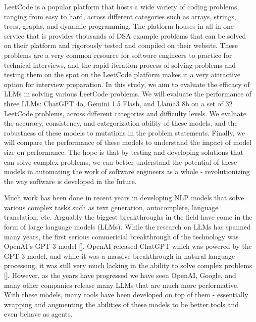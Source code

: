 \documentclass[times, 10pt,twocolumn]{article}
\begin{document}
LeetCode is a popular platform that hosts a wide variety of coding problems, ranging from easy to hard, across different categories such as arrays, strings, trees, graphs, and dynamic programming. The platform houses in all in one service that is provides thousands of DSA example problems that can be solved on their platform and rigorously tested and compiled on their website. These problems are a very common resource for software engineers to practice for technical interviews, and the rapid iteration process of solving problems and testing them on the spot on the LeetCode platform makes it a very attractive option for interview preparation. In this study, we aim to evaluate the efficacy of LLMs in solving various LeetCode problems. We will evaluate the performance of three LLMs: ChatGPT 4o, Gemini 1.5 Flash, and Llama3 8b on a set of 32 LeetCode problems, across different categories and difficulty levels. We evaluate the accuracy, consistency, and categorization ability of these models, and the robustness of these models to mutations in the problem statements. Finally, we will compare the performance of these models to understand the impact of model size on performance. The hope is that by testing and developing solutions that can solve complex problems, we can better understand the potential of these models in automating the work of software engineers as a whole - revolutionizing the way software is developed in the future.



Much work has been done in recent years in developing NLP models that solve various complex tasks such as text generation, autocomplete, language translation, etc. Arguably the biggest breakthroughs in the field have come in the form of large language models (LLMs). While the research on LLMs has spanned many years, the first serious commericial breakthrough of the technology was OpenAI's GPT-3 model []. OpenAI released ChatGPT which was powered by the GPT-3 model, and while it was a massive breakthrough in natural language processing, it was still very much lacking in the ability to solve complex problems []. However, as the years have progressed we have seen OpenAI, Google, and many other companies release many LLMs that are much more performative. With these models, many tools have been developed on top of them - essentially wrapping and augmenting the abilities of these models to be better tools and even behave as agents.
\end{document}

